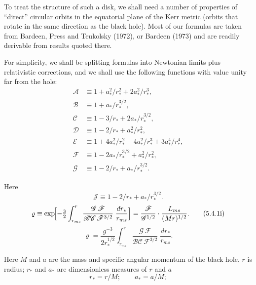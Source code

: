 To treat the structure of such a disk, we shall need a number of properties
of ``direct'' circular orbits in the equatorial plane of the Kerr metric (orbits that
rotate in the same direction as the black hole).  Most of our formulas are taken
from Bardeen, Press and Teukolsky (1972)\cite{Bardeen1972}, or Bardeen (1973)\cite{Bardeen1973} and are readily
derivable from results quoted there.

For simplicity, we shall be splitting formulas into Newtonian limits plus relativistic
corrections, and we shall use the following functions with value unity far
from the hole:
%
\begin{align}
\mathscr{A} &\equiv 1 + a_*^2/r_*^2 + 2a_*^2/r_*^3 , \tag{5.4.1a}\\[4pt]
\mathscr{B} &\equiv 1 + a_*/r_*^{3/2} , \tag{5.4.1b}\\[4pt]
\mathscr{C} &\equiv 1 - 3/r_* + 2a_*/r_*^{3/2} , \tag{5.4.1c}\\[4pt]
\mathscr{D} &\equiv 1 - 2/r_* + a_*^2/r_*^2 , \tag{5.4.1d}\\[4pt]
\mathscr{E} &\equiv 1 + 4a_*^2/r_*^2 - 4a_*^2/r_*^3 + 3a_*^4/r_*^4 , \tag{5.4.1e}\\[4pt]
\mathscr{F} &\equiv 1 - 2a_*/r_*^{3/2} + a_*^2/r_*^2 , \tag{5.4.1f}\\[4pt]
\mathscr{G} &\equiv 1 - 2/r_* + a_*/r_*^{3/2} . \tag{5.4.1g}
\end{align}

Here
\begin{equation}
\mathscr{J} \equiv 1 - 2/r_* + a_* /r_*^{3/2} . \tag{5.4.1h}
\end{equation}
%
\begin{equation}
\varrho \equiv \exp\!\Bigl[-\tfrac{3}{2}\int_{r_{ms}}^{r}\frac{\mathscr{G}\,\mathscr{F}}
{\mathscr{B}\mathscr{C}\,\mathscr{F}^{3/2}}\;\frac{dr_*}{r_{ms}}\Bigr]
= \frac{\mathscr{F}}{\mathscr{G}^{1/2}}\cdot\frac{L_{ms}}{(Mr)^{1/2}}.
\tag{5.4.1i}
\end{equation}
%
\begin{equation}
\varrho = \frac{g^{-3}}{2r_*^{1/2}}\int_{r_{ms}}^{r}
\frac{\mathscr{G}\,\mathscr{F}}
{\mathscr{B}\mathscr{C}\,\mathscr{F}^{3/2}}
\;\frac{dr_*}{r_{ms}}.
\tag{5.4.1j}
\end{equation}

Here $M$ and $a$ are the mass and specific angular momentum of the black hole, $r$ is
radius; $r_*$ and $a_*$ are dimensionless measures of $r$ and $a$
\begin{equation}
r_* = r/M;\qquad a_* = a/M;
\end{equation}


